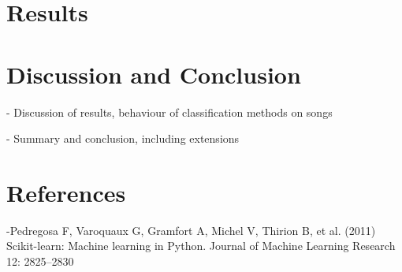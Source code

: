 \documentclass{article}
\begin{document}
\section{Results}

\section{Discussion and Conclusion}
- Discussion of results, behaviour of classification methods on songs

- Summary and conclusion, including extensions

\section{References}
-Pedregosa F, Varoquaux G, Gramfort A, Michel V, Thirion B, et al. (2011) Scikit-learn: Machine
learning in Python. Journal of Machine Learning Research 12: 2825–2830
\end{document}

